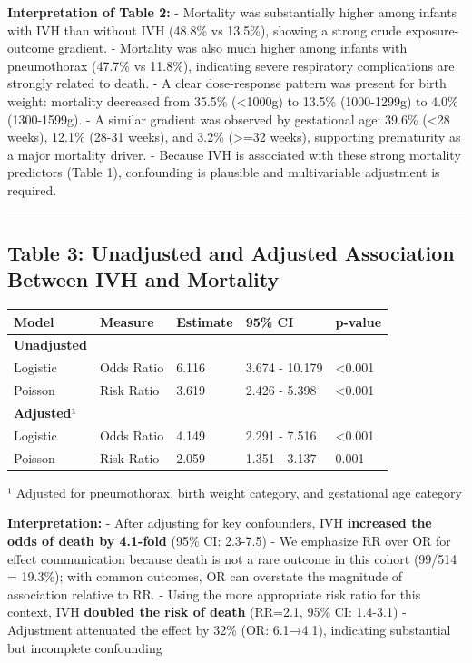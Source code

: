 \documentclass[
]{article}
\begin{document}
\textbf{Interpretation of Table 2:} - Mortality was substantially higher
among infants with IVH than without IVH (48.8\% vs 13.5\%), showing a
strong crude exposure-outcome gradient. - Mortality was also much higher
among infants with pneumothorax (47.7\% vs 11.8\%), indicating severe
respiratory complications are strongly related to death. - A clear
dose-response pattern was present for birth weight: mortality decreased
from 35.5\% (\textless1000g) to 13.5\% (1000-1299g) to 4.0\%
(1300-1599g). - A similar gradient was observed by gestational age:
39.6\% (\textless28 weeks), 12.1\% (28-31 weeks), and 3.2\%
(\textgreater=32 weeks), supporting prematurity as a major mortality
driver. - Because IVH is associated with these strong mortality
predictors (Table 1), confounding is plausible and multivariable
adjustment is required.

\begin{center}\rule{0.5\linewidth}{0.5pt}\end{center}

\hypertarget{table-3-unadjusted-and-adjusted-association-between-ivh-and-mortality}{%
\subsection{Table 3: Unadjusted and Adjusted Association Between IVH and
Mortality}\label{table-3-unadjusted-and-adjusted-association-between-ivh-and-mortality}}

\begin{longtable}[]{@{}lllll@{}}
\toprule
Model & Measure & Estimate & 95\% CI & p-value \\
\midrule
\endhead
\textbf{Unadjusted} & & & & \\
Logistic & Odds Ratio & 6.116 & 3.674 - 10.179 & \textless0.001 \\
Poisson & Risk Ratio & 3.619 & 2.426 - 5.398 & \textless0.001 \\
\textbf{Adjusted¹} & & & & \\
Logistic & Odds Ratio & 4.149 & 2.291 - 7.516 & \textless0.001 \\
Poisson & Risk Ratio & 2.059 & 1.351 - 3.137 & 0.001 \\
\bottomrule
\end{longtable}

¹ Adjusted for pneumothorax, birth weight category, and gestational age
category

\textbf{Interpretation:} - After adjusting for key confounders, IVH
\textbf{increased the odds of death by 4.1-fold} (95\% CI: 2.3-7.5) - We
emphasize RR over OR for effect communication because death is not a
rare outcome in this cohort (99/514 = 19.3\%); with common outcomes, OR
can overstate the magnitude of association relative to RR. - Using the
more appropriate risk ratio for this context, IVH \textbf{doubled the
risk of death} (RR=2.1, 95\% CI: 1.4-3.1) - Adjustment attenuated the
effect by 32\% (OR: 6.1→4.1), indicating substantial but incomplete
confounding
\end{document}
